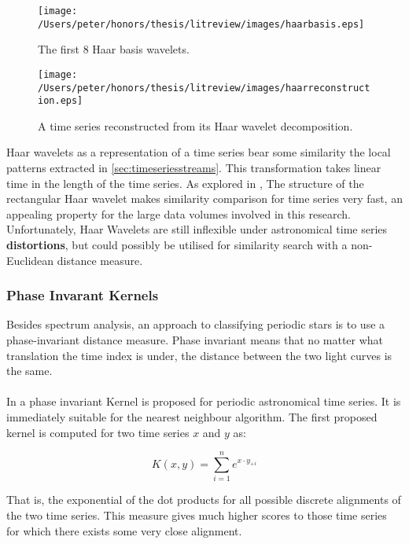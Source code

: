 	\begin{figure}[ht!]
	\centering
	\texttt{[image: /Users/peter/honors/thesis/litreview/images/haarbasis.eps]}
	\caption{The first 8 Haar basis wavelets.}
	\label{fig:haarwavelets}
	\end{figure}
	
	\begin{figure}[ht!]
	\centering
	\texttt{[image: /Users/peter/honors/thesis/litreview/images/haarreconstruction.eps]}
	\caption{A time series reconstructed from its Haar wavelet decomposition.}
	\label{fig:haarreconstruction}
	\end{figure}


	Haar wavelets as a representation of a time series bear some similarity the local patterns extracted in \ref{sec:timeseriesstreams}. This transformation takes linear time in the length of the time series. As explored in \citep{popivanov2002similarity}, The structure of the rectangular Haar wavelet makes similarity comparison for time series very fast, an appealing property for the large data volumes involved in this research. Unfortunately, Haar Wavelets are still inflexible under astronomical time series \textbf{distortions}, but could possibly be utilised for similarity search with a non-Euclidean distance measure.
	
	
	\subsubsection{Phase Invarant Kernels}
	Besides spectrum analysis, an approach to classifying periodic stars is to use a phase-invariant distance measure. Phase invariant means that no matter what translation the time index is under, the distance between the two light curves is the same.
	\paragraph{}
	In \citep{wachman2009kernels} a phase invariant Kernel is proposed for periodic astronomical time series. It is immediately suitable for the nearest neighbour algorithm. The first proposed kernel is computed for two time series $x$ and $y$ as:
	\begin{center}
	\begin{equation*}
		K(x,y) = \sum\limits_{i=1}^{n}e^{ x \cdot y_{+i}}
	\end{equation*}
	\end{center}
	That is, the exponential of the dot products for all possible discrete alignments of the two time series. 	This measure gives much higher scores to those time series for which there exists some very close alignment.
